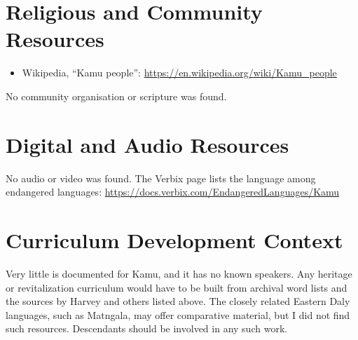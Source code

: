 \documentclass[12pt]{article}
\begin{document}
\section{Religious and Community Resources}
\begin{itemize}
\item Wikipedia, ``Kamu people'': \url{https://en.wikipedia.org/wiki/Kamu_people}
\end{itemize}
No community organisation or scripture was found.

\section{Digital and Audio Resources}
No audio or video was found. The Verbix page lists the language among endangered languages: \url{https://docs.verbix.com/EndangeredLanguages/Kamu}

\section{Curriculum Development Context}
Very little is documented for Kamu, and it has no known speakers. Any heritage or revitalization curriculum would have to be built from archival word lists and the sources by Harvey and others listed above. The closely related Eastern Daly languages, such as Matngala, may offer comparative material, but I did not find such resources. Descendants should be involved in any such work.
\end{document}
